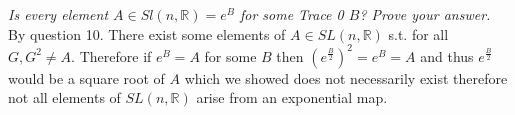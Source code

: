 \documentclass{article}
\begin{document}
    \section{}
    \emph{Is every element $A \in Sl(n, \mathbb{R} ) = e^{B}$ for some Trace 0 $B$? Prove your answer.}\\
    By question 10. There exist some elements of $A \in SL(n, \mathbb{R} )$ s.t. for all $G, G^2 \ne A$. Therefore if $e^{B} = A$ for some $B$ then $(e^{\frac{B}{2}})^{2} = e^{B} = A$ and thus
    $e^{\frac{B}{2}}$ would be a square root of $A$ which we showed does not necessarily exist therefore not all elements of $SL(n, \mathbb{R} )$ arise from an exponential map.




        
\end{document}
